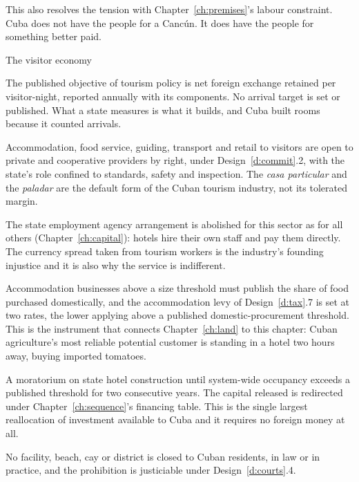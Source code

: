 This also resolves the tension with Chapter~\ref{ch:premises}'s labour
constraint. Cuba does not have the people for a Cancún. It does have the people
for something better paid.

\begin{design}{The visitor economy}
\label{d:visitor}
\begin{rules}
 The published objective of tourism policy is net foreign
exchange retained per visitor-night, reported annually with its components. No
arrival target is set or published. What a state measures is what it builds, and
Cuba built rooms because it counted arrivals.

 Accommodation, food service, guiding, transport and
retail to visitors are open to private and cooperative providers by right, under
Design~\ref{d:commit}.2, with the state's role confined to standards, safety and
inspection. The \emph{casa particular} and the \emph{paladar} are the default
form of the Cuban tourism industry, not its tolerated margin.

 The state employment agency
arrangement is abolished for this sector as for all others
(Chapter~\ref{ch:capital}): hotels hire their own staff and pay them directly.
The currency spread taken from tourism workers is the industry's founding
injustice and it is also why the service is indifferent.

 Accommodation businesses above a size threshold must
publish the share of food purchased domestically, and the accommodation levy of
Design~\ref{d:tax}.7 is set at two rates, the lower applying above a published
domestic-procurement threshold. This is the instrument that connects
Chapter~\ref{ch:land} to this chapter: Cuban agriculture's most reliable
potential customer is standing in a hotel two hours away, buying imported
tomatoes.

 A moratorium on state hotel construction until
system-wide occupancy exceeds a published threshold for two consecutive years.
The capital released is redirected under Chapter~\ref{ch:sequence}'s financing
table. This is the single largest reallocation of investment available to Cuba
and it requires no foreign money at all.

 No facility, beach, cay or district is closed to Cuban
residents, in law or in practice, and the prohibition is justiciable under
Design~\ref{d:courts}.4.
\end{rules}
\end{design}


